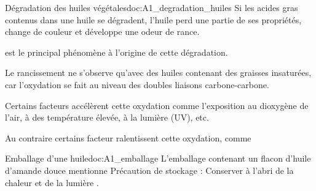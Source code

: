 



\begin{doc}{Dégradation des huiles végétales}{doc:A1_degradation_huiles}
  Si les acides gras contenus dans une huile se dégradent, l’huile perd une partie de ses propriétés, change de couleur et développe une odeur de rance.
  \begin{importants}  
     est le principal phénomène à l’origine de cette dégradation.
  \end{importants}
  Le rancissement ne s'observe qu'avec des huiles contenant des graisses insaturées, car l'oxydation se fait au niveau des doubles liaisons carbone-carbone.
  \begin{importants}  
    Certains facteurs accélèrent cette oxydation comme l’exposition au dioxygène de l’air, à des température élevée, à la lumière (UV), etc.
  \end{importants}
  \begin{importants}
    Au contraire certains facteur ralentissent cette oxydation, comme 
  \end{importants}
\end{doc}



\begin{doc}{Emballage d'une huile}{doc:A1_emballage}  
  L'emballage contenant un flacon d'huile d'amande douce mentionne \og Précaution de stockage : Conserver à l’abri de la chaleur et de la lumière \fg.
\end{doc}



